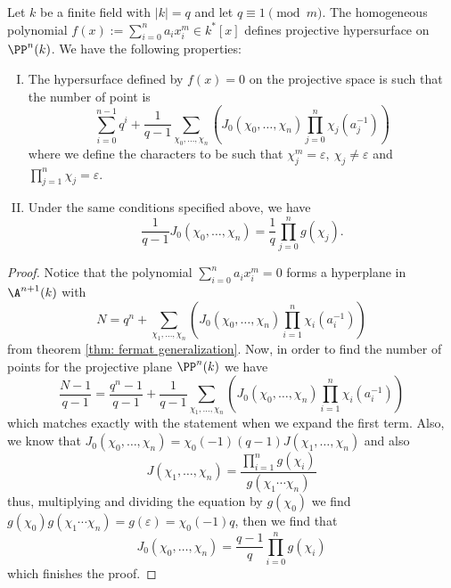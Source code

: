 \begin{theorem}
    Let \(k\) be a finite field with \(|k| = q \) and let \(q \equiv 1
    \pmod{m}\). The homogeneous polynomial \(f(x) := \sum_{i=0}^{n} a_i x_i^{m}
    \in k^\ast[x]\) defines projective hypersurface on \(\PP^{n}(k)\). We have
    the following properties:
    \begin{enumerate}[I.]
        \item The hypersurface defined by \(f(x) = 0\) on the projective space is
              such that the number of point is
              \[
                  \sum_{i=0}^{n-1} q^i + \frac{1}{q-1} \sum_{\chi_0,\dots,\chi_n}
                  \left( J_0(\chi_0,\dots,\chi_n)\prod_{j=0}^{n} \chi_j(a_j^{-1})
                  \right)
              \]
              where we define the characters to be such that \(\chi_j^m =
              \varepsilon,\ \chi_j \neq  \varepsilon\) and \(\prod_{j=1}^n \chi_j =
              \varepsilon\).
        \item Under the same conditions specified above, we have
              \[
                  \frac{1}{q-1} J_0(\chi_0,\dots,\chi_n) = \frac{1}{q} \prod_{j=0}^{n}
                  g(\chi_j).
              \]
    \end{enumerate}
\end{theorem}

\begin{proof}
    Notice that the polynomial \(\sum_{i=0}^{n} a_ix_i^{m} = 0\) forms a
    hyperplane in \(\A^{n+1}(k)\) with
    \[
        N = q^n + \sum_{\chi_1,\dots, \chi_n} \left( J_0(\chi_0,\dots,\chi_n)
        \prod_{i=1}^n \chi_i(a_i^{-1}) \right)
    \]
    from theorem \ref{thm: fermat generalization}. Now, in order to find the
    number of points for the projective plane \(\PP^n(k)\) we have
    \[
        \frac{N-1}{q-1} = \frac{q^n - 1}{q-1} + \frac{1}{q-1}\sum_{\chi_1,\dots,
            \chi_n} \left( J_0(\chi_0,\dots,\chi_n) \prod_{i=1}^n \chi_i(a_i^{-1})
        \right)
    \]
    which matches exactly with the statement when we expand the first term.
    Also, we know that \(J_0(\chi_0,\dots,\chi_n) =
    \chi_0(-1)(q-1)J(\chi_1,\dots,\chi_n)\) and also
    \[
        J(\chi_1,\dots,\chi_n) = \frac{\prod_{i=1}^{n}
            g(\chi_i)}{g(\chi_1\cdots\chi_n)}
    \]
    thus, multiplying and dividing the equation by \(g(\chi_0)\) we find
    \(g(\chi_0)g(\chi_1\cdots\chi_n) = g(\varepsilon) = \chi_0(-1)q\), then we
    find that
    \[
        J_0(\chi_0,\dots,\chi_n) = \frac{q-1}{q} \prod_{i=0}^{n} g(\chi_i)
    \]
    which finishes the proof.
\end{proof}
